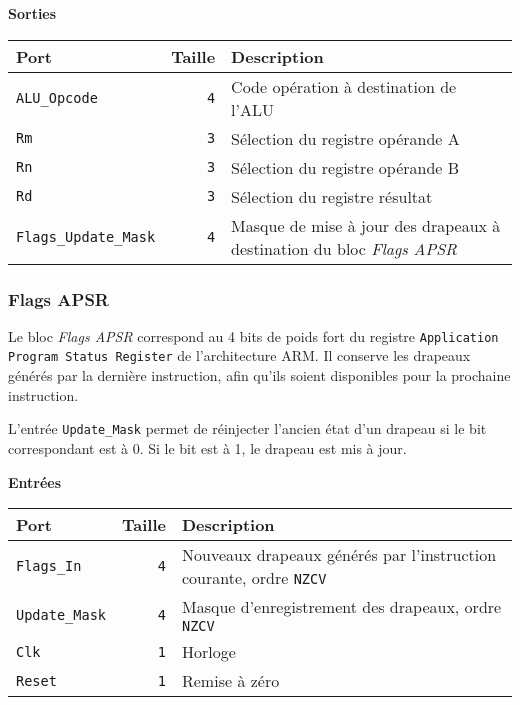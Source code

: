 \vspace{1em}
\textbf{Sorties}\\

\begin{tabular}{|l|r|l|}
\hline 
\textbf{Port} & \textbf{Taille} & \textbf{Description}\\
\hline

\texttt{ALU\_Opcode}		&  \texttt{4} & Code opération à destination de l'ALU\\
\hline
\texttt{Rm}			&  \texttt{3} & Sélection du registre opérande A\\
\hline
\texttt{Rn}			&  \texttt{3} & Sélection du registre opérande B\\
\hline
\texttt{Rd}			&  \texttt{3} & Sélection du registre résultat\\
\hline
\texttt{Flags\_Update\_Mask}	&  \texttt{4} & Masque de mise à jour des drapeaux à destination du bloc \textit{Flags APSR}\\

\hline
\end{tabular}




\subsubsection{Flags APSR}



Le bloc \textit{Flags APSR} correspond au 4 bits de poids fort du registre \texttt{Application Program Status Register} de l'architecture ARM. Il conserve les drapeaux générés par la dernière instruction, afin qu'ils soient disponibles pour la prochaine instruction.

L'entrée \texttt{Update\_Mask} permet de réinjecter l'ancien état d'un drapeau si le bit correspondant est à 0. Si le bit est à 1, le drapeau est mis à jour.


\textbf{Entrées}\\

\begin{tabular}{|l|r|l|}
\hline
\textbf{Port}		& \textbf{Taille} & \textbf{Description}\\
\hline

\texttt{Flags\_In}	&  \texttt{4} & Nouveaux drapeaux générés par l'instruction courante, ordre \texttt{NZCV}\\
\hline
\texttt{Update\_Mask}	&  \texttt{4} & Masque d'enregistrement des drapeaux, ordre \texttt{NZCV}\\
\hline
\texttt{Clk}		&  \texttt{1} & Horloge\\
\hline
\texttt{Reset}		&  \texttt{1} & Remise à zéro\\


\hline
\end{tabular}

